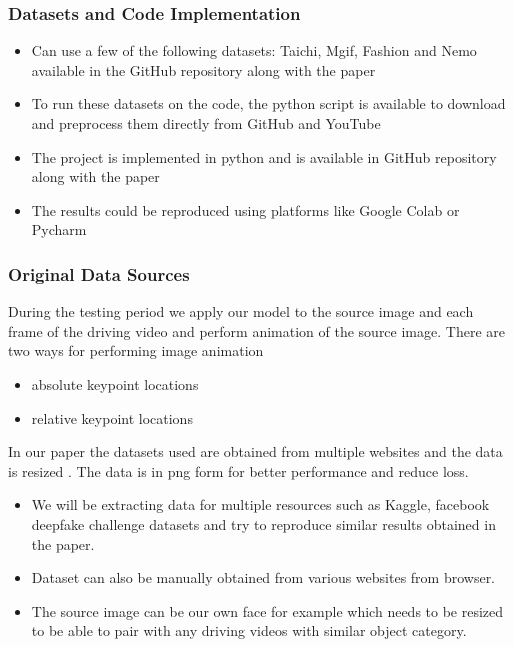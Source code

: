 \documentclass[11pt]{beamer}
\begin{document}
\begin{frame}
\frametitle{Datasets and Code Implementation}
\begin{itemize}
\item Can use a few of the following datasets: Taichi, Mgif, Fashion and Nemo available in the GitHub repository along with the paper
\item To run these datasets on the code, the python script is available to download and preprocess them directly from GitHub and YouTube
\item The project is implemented in python and is available in GitHub repository along with the paper
\item The results could be reproduced using platforms like Google Colab or Pycharm
\end{itemize}
\end{frame}
\begin{frame}
\frametitle{Original Data Sources}
During the testing period we apply our model to the source image and each frame of the driving video and perform animation of the source image.
There are two ways for performing image animation
\begin{itemize}
\item absolute keypoint locations 	
\item relative keypoint  locations
\end{itemize}
In our paper the datasets used are  obtained from multiple websites and the data is resized . The data is in png form  for better performance and reduce loss.
\begin{itemize}
\item We will be extracting data for multiple resources such as Kaggle, facebook deepfake challenge datasets and try to reproduce similar results obtained in the paper. 
\item Dataset can also be manually obtained from various websites from browser.
\item The source image can be our own face for example which needs to be resized to be able to pair with any driving videos with similar object category.
\end{itemize}

\end{frame}
\end{document}
